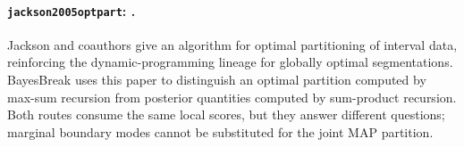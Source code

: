 
\paragraph{\texttt{jackson2005optpart}: \citet{jackson2005optpart}.}
Jackson and coauthors give an algorithm for optimal partitioning of interval data, reinforcing the dynamic-programming lineage for globally optimal segmentations. BayesBreak uses this paper to distinguish an optimal partition computed by max-sum recursion from posterior quantities computed by sum-product recursion. Both routes consume the same local scores, but they answer different questions; marginal boundary modes cannot be substituted for the joint MAP partition.
